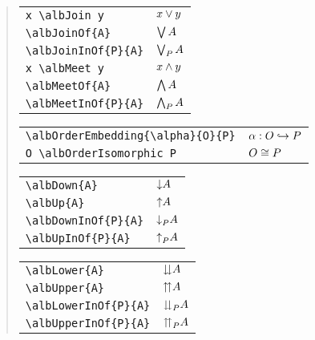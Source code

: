 \documentclass[11pt,a4paper,oneside]{alb-corp}
\begin{document}
\begin{quote}
  \begin{tabular}{p{}@{\qquad}p{}}
    \verb$x \albJoin y$ & $x \vee y$ \\
    \verb$\albJoinOf{A}$ & $\bigvee A$ \\
    \verb$\albJoinInOf{P}{A}$ & $\bigvee\nolimits_{P} A$ \\
    \verb$x \albMeet y$ & $x \wedge y$ \\
    \verb$\albMeetOf{A}$ & $\bigwedge A$ \\
    \verb$\albMeetInOf{P}{A}$ & $\bigwedge\nolimits_{P} A$
  \end{tabular}

  \begin{tabular}{p{}@{\qquad}p{}}
    \verb$\albOrderEmbedding{\alpha}{O}{P}$ &
    $\albOrderEmbedding{\alpha}{O}{P}$ \\
    \verb$O \albOrderIsomorphic P$ & $O \cong P$
  \end{tabular}

  \begin{tabular}{p{}@{\qquad}p{}}
    \verb$\albDown{A}$ & $\mathord{\downarrow}A$ \\
    \verb$\albUp{A}$ & $\mathord{\uparrow}A$ \\
    \verb$\albDownInOf{P}{A}$ & $\mathord{\downarrow}_{P}A$ \\
    \verb$\albUpInOf{P}{A}$ & $\mathord{\uparrow}_{P}A$
  \end{tabular}

  \begin{tabular}{p{}@{\qquad}p{}}
    \verb$\albLower{A}$ & $\mathord{\downdownarrows}A$ \\
    \verb$\albUpper{A}$ & $\mathord{\upuparrows}A$ \\
    \verb$\albLowerInOf{P}{A}$ & $\mathord{\downdownarrows}_{P}A$ \\
    \verb$\albUpperInOf{P}{A}$ & $\mathord{\upuparrows}_{P}A$
  \end{tabular}


\end{quote}
\end{document}
